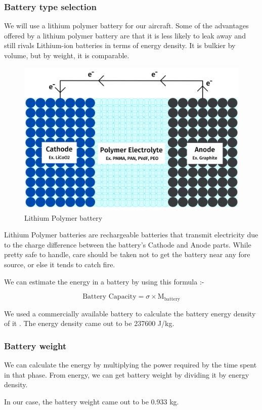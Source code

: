 \documentclass[12 pt]{article}
\begin{document}
\subsubsection{{Battery type selection \cite{Lipobattery}}}
We will use a lithium polymer battery for our aircraft. Some of the advantages offered by a lithium polymer battery are that it is less likely to leak away and still rivals Lithium-ion batteries in terms of energy density. It is bulkier by volume, but by weight, it is comparable.

\begin{figure}[h]
    \centering
    \includegraphics[width=0.5\linewidth]{Extra pics/LiPo_battery_diagram.png}
    \caption{{Lithium Polymer battery}}
    \label{Lithium Polymer battery}
\end{figure}

Lithium Polymer batteries are rechargeable batteries that transmit electricity due to the charge difference between the battery's Cathode and Anode parts. While pretty safe to handle, care should be taken not to get the battery near any fore source, or else it tends to catch fire.

We can estimate the energy in a battery by using this formula \cite{Lipobattery}:-

$$ \text{Battery Capacity} = \sigma \times \text{M}_\text{battery} $$

We used a commercially available battery to calculate the battery energy density of it \cite{Batteryref}. The energy density came out to be 237600 J/kg.

\subsubsection{{Battery weight}}

We can calculate the energy by multiplying the power required by the time spent in that phase. From energy, we can get battery weight by dividing it by energy density. 

In our case, the battery weight came out to be 0.933 kg.
\end{document}
